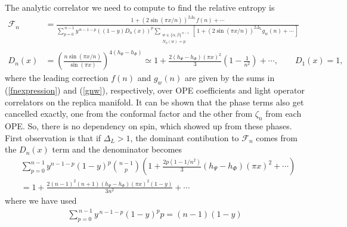 \documentclass[11pt]{article}
\newcommand{\nn}{\nonumber}
\newcommand{\lb}{\left(}
\newcommand{\rb}{\right)}
\begin{document}
  The analytic correlator we need to compute to find the relative entropy is
  \begin{align}
    \label{eq:F_n_mixed}\mathcal{F}_{n} & =\frac{\,1+(2\sin(\pi x/n))^{2\Delta_L}f(n)+\cdots\,}{\displaystyle \sum_{p=0}^{\,n-1}y^{\,n-1-p}((1-y)D_n(x))^{p}\sum_{\substack{w\in\{\alpha,\beta\}^{\,n-1}\\ N_\beta(w)=p}}\left[\,1+(2\sin(\pi x/n))^{2\Delta_L}g_{w}(n)+\cdots\,\right] }\\
    \label{Dn_mixed}
    D_{n}(x)&=\left(\frac{n\sin(\pi x/n)}{\sin(\pi x)}\right)^{4(h_\Psi-h_\Phi)}\simeq 1+\frac{2(h_\Psi-h_\Phi)(\pi x)^2}{3}\lb 1-\frac{1}{n^2}\rb+\cdots 
    ,\qquad D_{1}(x)=1,
  \end{align}
  where the leading correction $f(n)$ and $g_w(n)$ are given by the sums in (\ref{fnexpression}) and (\ref{gnw}), respectively, over OPE coefficients and light operator correlators on the replica manifold. It can be shown that the phase terms also get cancelled exactly, one from the conformal factor and the other from $\zeta_n$ from each OPE. So, there is no dependency on spin, which showed up from these phases. First observation is that if $\Delta_L> 1$, the dominant contibution to $\mathcal{F}_n$ comes from the $D_n(x)$ term and the denominator becomes 
  \begin{align}
    &\sum_{p=0}^{n-1} y^{n-1-p}(1-y)^p\binom{n-1}{p}\lb 1+\frac{2p(1-1/n^2)}{3}(h_\Psi-h_\Phi)(\pi x)^2+\cdots\rb\nn\\
    &=1+\frac{2(n-1)^2(n+1)(h_\Psi-h_\Phi)(\pi x)^2(1-y)}{3n^2}+\cdots 
  \end{align}
  where we have used 
  \begin{align}
  \sum_{p=0}^{\,n-1}y^{\,n-1-p}(1-y)^{p}p = (n-1)(1-y)
  \end{align}
\end{document}
